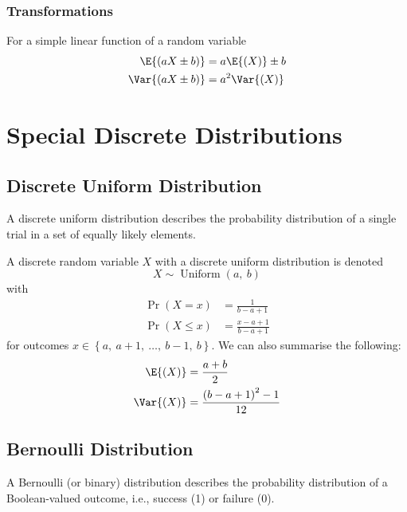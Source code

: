 \documentclass{article}
\begin{document}
\subsubsection{Transformations}
For a simple linear function of a random variable
\begin{align*}
    \E{\left( aX \pm b \right)}   & = a\E{\left( X \right)} \pm b \\
    \Var{\left( aX \pm b \right)} & = a^2\Var{\left( X \right)}
\end{align*}
\section{Special Discrete Distributions}
\subsection{Discrete Uniform Distribution}
A discrete uniform distribution describes the probability distribution of a single trial
in a set of equally likely elements.

A discrete random variable \(X\) with a discrete uniform distribution is denoted
\begin{equation*}
    X \sim \operatorname{Uniform}{\left( a,\: b \right)}
\end{equation*}
with
\begin{align*}
    \Pr{\left( X = x \right)}    & = \frac{1}{b - a + 1}         \\
    \Pr{\left( X \leq x \right)} & = \frac{x - a + 1}{b - a + 1}
\end{align*}
for outcomes \(x \in \left\{ a,\: a + 1,\: \dots,\: b - 1,\: b \right\}\).
We can also summarise the following:
\begin{align*}
    \E{\left( X \right)}   & = \frac{a + b}{2}                           \\
    \Var{\left( X \right)} & = \frac{\left( b - a + 1 \right)^2 - 1}{12}
\end{align*}
\subsection{Bernoulli Distribution}
A Bernoulli (or binary) distribution describes the probability distribution of a Boolean-valued
outcome, i.e., success (1) or failure (0).
\end{document}
